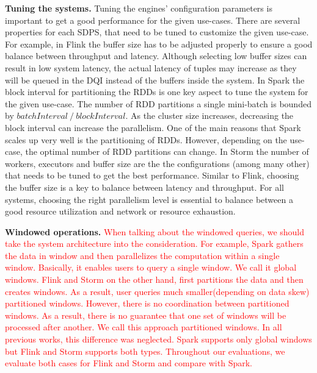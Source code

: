 \textbf{Tuning the systems.}
Tuning the engines' configuration parameters is important to get a good performance for the given use-cases. %
There are several properties for each SDPS, that need to be tuned to customize the given use-case. For example, in Flink the buffer size has to be adjusted properly to ensure a good balance between throughput and latency. Although selecting low buffer sizes can result in low system latency, the actual latency of tuples may increase as they will be queued in the DQI instead of the buffers inside the system. In Spark the block interval for partitioning the RDDs is one key aspect to tune the system for the given use-case. The number of RDD partitions a single mini-batch  is bounded by $batchInterval \ / \ blockInterval$. As the cluster size increases, decreasing the block interval can increase the parallelism. One of the main reasons that Spark scales up very well is the partitioning of RDDs. However, depending on the use-case, the optimal number of RDD partitions can change. In Storm the number of workers, executors and buffer size are the the configurations (among many other) that needs to be tuned to get the best performance. Similar to Flink, choosing the buffer size is a key to balance between latency and throughput. For all systems,  choosing the right parallelism level is essential to balance between a good resource utilization and network or resource exhaustion.




\textbf{Windowed operations.} \textcolor{red}{When talking about the windowed queries, we should take the system architecture into the consideration. For example, Spark gathers the data in window and then parallelizes the computation within a single window. Basically, it enables users to query a single window. We call it global windows. Flink and Storm on the other hand, first partitions the data and then creates windows. As a result, user queries much smaller(depending on data skew) partitioned windows. However, there is no coordination between partitioned windows. As a result, there is no guarantee that one set of windows will be processed after another. We call this approach partitioned windows. 
	In all previous works, this difference was neglected. Spark supports only global windows but Flink and Storm supports both types. Throughout our evaluations, we evaluate both cases for Flink and Storm and compare with Spark.  }

